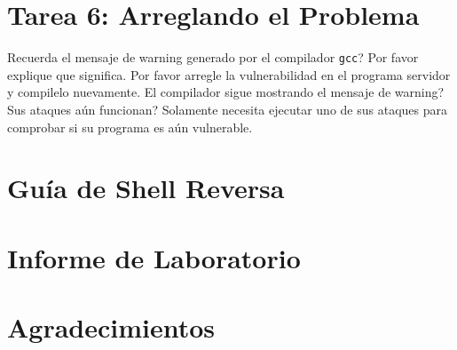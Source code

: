 \section{Tarea 6: Arreglando el Problema}

Recuerda el mensaje de warning generado por el compilador \texttt{gcc}? Por favor explique que significa. Por favor arregle la vulnerabilidad en el programa servidor y compilelo nuevamente.
El compilador sigue mostrando el mensaje de warning? Sus ataques aún funcionan? Solamente necesita ejecutar uno de sus ataques para comprobar si su programa es aún vulnerable.


\section{Guía de Shell Reversa}
\label{sec:guildelines}






\section{Informe de Laboratorio}




\section*{Agradecimientos}






